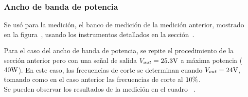 \vfill
\clearpage


\subsubsection{Ancho de banda de potencia}

Se usó para la medición, el banco de medición de la medición anterior, mostrado en la figura~, usando los instrumentos detallados en la sección~.


 Para el caso del ancho de banda de potencia, se repite el procedimiento de la sección anterior pero con una señal de salida $V_{out} = 25.3 \si[per-mode=symbol]{\volt}$ a máxima potencia ($40 \si[per-mode=symbol]{\watt}$). En este caso, las frecuencias de corte se determinan cuando $V_{out} = 24 \si[per-mode=symbol]{\volt}$, tomando como en el caso anterior las frecuencias de corte al $10 \si[per-mode=symbol]{\percent}$.\\
Se pueden observar los resultados de la medición en el cuadro ~.


